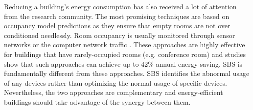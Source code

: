 Reducing a building's energy consumption has also received a lot of attention from the research community.
The most promising techniques are based on occupancy model predictions as they ensure that empty rooms are not over conditioned needlessly.
Room occupancy is usually monitored through sensor networks \cite{agarwal:ipsn2011,erickson:ipsn2011} or the computer network traffic \cite{kim:buildsys2010}.
These approaches are highly effective for buildings that have rarely-occupied rooms (e.g. conference room) and studies show that such approaches
 can achieve up to 42\% annual energy saving.
SBS is fundamentally different from these approaches.  SBS identifies the abnormal usage of any devices rather than optimizing the normal usage of specific devices.
Nevertheless, the two approaches are complementary and energy-efficient buildings should take advantage of the synergy between them.






% 
% 
% 
% 

% 
% 
% 
% 
% 
% 
% 
% 